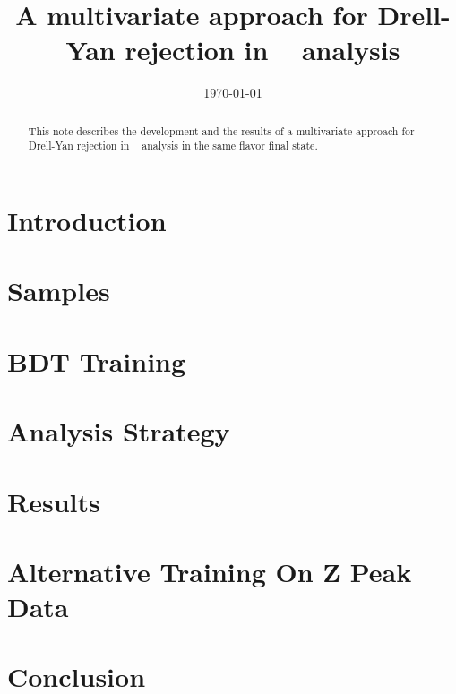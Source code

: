 \documentclass{cmspaper}
\begin{document}
\begin{titlepage}


  \date{\today}

  \title{A multivariate approach for Drell-Yan rejection in \hww~ analysis}
  
  

  \begin{abstract}
    This note describes the development and the results of a  multivariate approach for Drell-Yan rejection in \hww~ analysis in the same flavor final state.
  \end{abstract} 

\end{titlepage}
\tableofcontents
\listoftables
\listoffigures
\newpage 

\section{Introduction}
   \label{sec:introduction}
   

\section{Samples}
  \label{sec:datasets}
  

\section{BDT Training}
  \label{sec:training}
  

\section{Analysis Strategy}
  \label{sec:strategy}
  

\section{Results}
  \label{sec:results}
  

\section{Alternative Training On Z Peak Data}
  \label{sec:zdatatrain}
  

\section{Conclusion}
   
\clearpage

\end{document}
